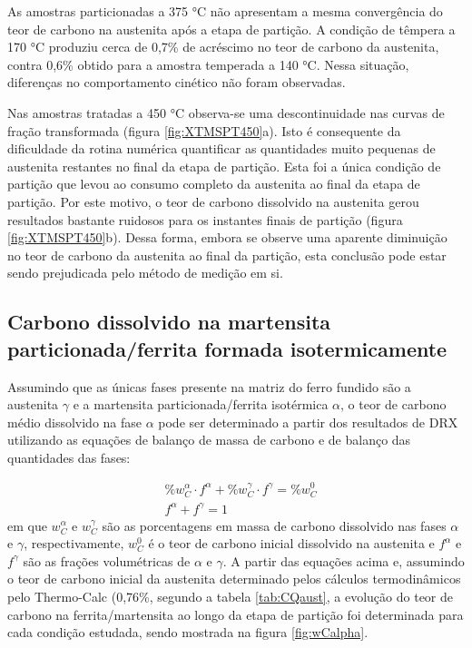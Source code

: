 As amostras particionadas a 375 °C não apresentam a mesma convergência do teor de carbono na austenita após a etapa de partição. A condição de têmpera a 170 °C produziu cerca de 0,7\% de acréscimo no teor de carbono da austenita, contra 0,6\% obtido para a amostra temperada a 140 °C. Nessa situação, diferenças no comportamento cinético não foram observadas.

Nas amostras tratadas a 450 °C observa-se uma descontinuidade nas curvas de fração transformada (figura \ref{fig:XTMSPT450}a). Isto é consequente da dificuldade da rotina numérica quantificar as quantidades muito pequenas de austenita restantes no final da etapa de partição. Esta foi a única condição de partição que levou ao consumo completo da austenita ao final da etapa de partição. Por este motivo, o teor de carbono dissolvido na austenita gerou resultados bastante ruidosos para os instantes finais de partição (figura \ref{fig:XTMSPT450}b). Dessa forma, embora se observe uma aparente diminuição no teor de carbono da austenita ao final da partição, esta conclusão pode estar sendo prejudicada pelo método de medição em si.

\subsection{Carbono dissolvido na martensita particionada/ferrita formada isotermicamente}

\label{subsec:wCalpha}

Assumindo que as únicas fases presente na matriz do ferro fundido são a austenita $\gamma$ e a martensita particionada/ferrita isotérmica $\alpha$, o teor de carbono médio dissolvido na fase $\alpha$ pode ser determinado a partir dos resultados de DRX utilizando as equações de balanço de massa de carbono e de balanço das quantidades das fases:

\begin{subequations}
	\begin{align}
		&\%w_C^\alpha \cdot f^\alpha + \%w_C^\gamma \cdot f^\gamma = \%w_C^0\\
		&f^\alpha + f^\gamma = 1 
	\end{align}
	\label{eq:wCalpha}
\end{subequations}
%
em que $w_C^\alpha$ e $w_C^\gamma$ são as porcentagens em massa de carbono dissolvido nas fases $\alpha$ e $\gamma$, respectivamente, $w_C^0$ é o teor de carbono inicial dissolvido na austenita e $f^\alpha$ e $f^\gamma$ são as frações volumétricas de $\alpha$ e $\gamma$. A partir das equações acima e, assumindo o teor de carbono inicial da austenita determinado pelos cálculos termodinâmicos pelo Thermo-Calc\textregistered{} (0,76\%, segundo a tabela \ref{tab:CQaust}, a evolução do teor de carbono na ferrita/martensita ao longo da etapa de partição foi determinada para cada condição estudada, sendo mostrada na figura \ref{fig:wCalpha}.

